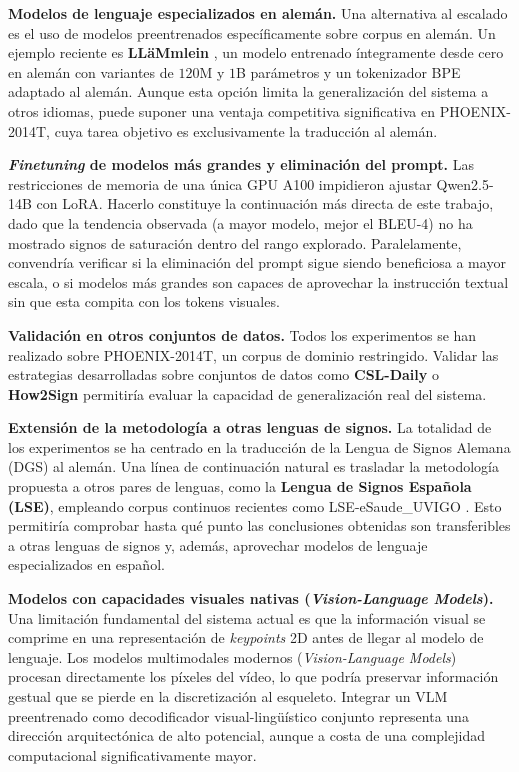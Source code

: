 \textbf{Modelos de lenguaje especializados en alemán.}
Una alternativa al escalado es el uso de modelos preentrenados específicamente sobre corpus en alemán.
Un ejemplo reciente es \textbf{LLäMmlein} \cite{llammlein}, un modelo entrenado íntegramente desde cero en alemán con variantes de $120$M y $1$B parámetros y un tokenizador BPE adaptado al alemán.
Aunque esta opción limita la generalización del sistema a otros idiomas, puede suponer una ventaja competitiva significativa en PHOENIX-2014T, cuya tarea objetivo es
exclusivamente la traducción al alemán.

\textbf{\textit{Finetuning} de modelos más grandes y eliminación del prompt.}
Las restricciones de memoria de una única GPU A100 impidieron ajustar Qwen2.5-14B con LoRA.
Hacerlo constituye la continuación más directa de este trabajo, dado que la tendencia observada (a mayor modelo, mejor el BLEU-4) no ha mostrado signos de
saturación dentro del rango explorado.
Paralelamente, convendría verificar si la eliminación del prompt sigue siendo beneficiosa a mayor escala, o si modelos más grandes son capaces de aprovechar la instrucción textual sin que esta compita con los tokens visuales.

\textbf{Validación en otros conjuntos de datos.}
Todos los experimentos se han realizado sobre PHOENIX-2014T, un corpus de dominio
restringido.
Validar las estrategias desarrolladas sobre conjuntos de datos como \textbf{CSL-Daily} o \textbf{How2Sign} permitiría evaluar la capacidad de generalización real del sistema.%

\textbf{Extensión de la metodología a otras lenguas de signos.}
La totalidad de los experimentos se ha centrado en la traducción de la Lengua de Signos Alemana (DGS) al alemán.
Una línea de continuación natural es trasladar la metodología propuesta a otros pares de lenguas, como la \textbf{Lengua de Signos Española (LSE)}, empleando corpus continuos recientes como LSE-eSaude\_UVIGO \cite{docio2022eccv}.
Esto permitiría comprobar hasta qué punto las conclusiones obtenidas son transferibles a otras lenguas de signos y, además, aprovechar modelos de lenguaje especializados en español.

\textbf{Modelos con capacidades visuales nativas (\textit{Vision-Language Models}).}
Una limitación fundamental del sistema actual es que la información visual se comprime en una representación de \textit{keypoints} 2D antes de llegar al modelo de lenguaje.
Los modelos multimodales modernos (\textit{Vision-Language Models}) procesan directamente los píxeles del vídeo, lo que podría preservar información gestual que se pierde en la discretización al esqueleto.
Integrar un VLM preentrenado como decodificador visual-lingüístico conjunto representa una dirección arquitectónica de alto potencial, aunque a costa de una complejidad
computacional significativamente mayor.

